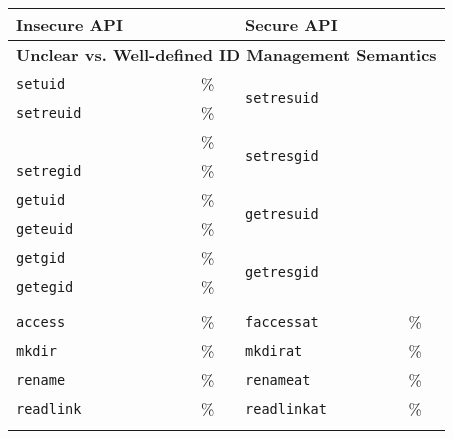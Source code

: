 \begin{table}[t!b!]
\footnotesize
\centering
\begin{tabular}{m{1.2in}>{\raggedleft\arraybackslash}m{1.2in}m{1.2in}>{\raggedleft\arraybackslash}m{1.2in}}
\toprule
{\bf Insecure API} & {\bf \UnwusageMetric{}} & {\bf Secure API} & {\bf \Unwusagemetric{}}\\
\midrule
\multicolumn{4}{c}{\bf Unclear vs. Well-defined ID Management Semantics} \\
\midrule
\addlinespace
{\tt setuid}   & 15.67\% & \multirow{2}{*}{\tt setresuid} & \multirow{2}{*}{99.68\%} \\
{\tt setreuid} &  1.88\% & & \\
\addlinespace {\tt setgid}   & 12.07\% & \multirow{2}{*}{\tt setresgid} & \multirow{2}{*}{99.68\%} \\
{\tt setregid} &  1.24\% & & \\
\addlinespace
{\tt getuid}   & 99.81\% & \multirow{2}{*}{\tt getresuid} & \multirow{2}{*}{36.19\%} \\
{\tt geteuid}  & 55.15\% & & \\
\addlinespace
{\tt getgid}   & 99.81\% & \multirow{2}{*}{\tt getresgid} & \multirow{2}{*}{36.14\%} \\
{\tt getegid}  & 48.87\% & & \\
\addlinespace
\midrule
\multicolumn{4}{c}{\bf Nonatomic vs. Atomic Directory operations} \\
\midrule
{\tt access}   & 74.24\% & {\tt faccessat}  & 0.63\% \\
\addlinespace
{\tt mkdir}    & 52.07\% & {\tt mkdirat}    & 0.34\% \\
{\tt rename}   & 43.18\% & {\tt renameat}   & 0.30\% \\
{\tt readlink} & 46.38\% & {\tt readlinkat} & 0.50\% \\
\addlinespace

\end{tabular}
\end{table}

